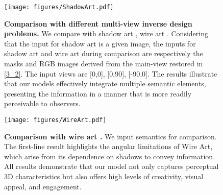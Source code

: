 \begin{figure}[ht]
    \centering
    \texttt{[image: figures/ShadowArt.pdf]}
    \caption{\textbf{Comparison with different multi-view inverse design problems.} We compare with shadow art \cite{MP09}, wire art \cite{Fabricable3DWireArt}. Considering that the input for shadow art is a given image, the inputs for shadow art and wire art during comparison are respectively the masks and RGB images derived from the main-view restored in \ref{3_2}. The input views are [0,0], [0,90], [-90,0]. The results illustrate that our models effectively integrate multiple semantic elements, presenting the information in a manner that is more readily perceivable to observers. }
    \label{fig:ShadowArt}
\end{figure}

\begin{figure}[ht]
    \centering
    \texttt{[image: figures/WireArt.pdf]}
    \caption{\textbf{Comparison with wire art \cite{Fabricable3DWireArt}.} We input semantics for comparison. The first-line result highlights the angular limitations of Wire Art, which arise from its dependence on shadows to convey information. All results demonstrate that our model not only captures perceptual 3D characteristics but also offers high levels of creativity, visual appeal, and engagement.}
    \label{fig:wireArt}
\end{figure}